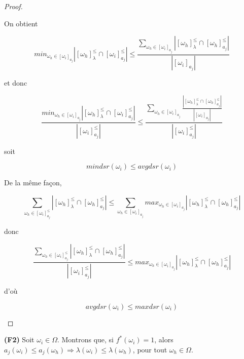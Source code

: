 \documentclass[a4paper]{article}
\begin{document}
\begin{proof}
\begin{itemize}
    On obtient
    
    $$min_{\omega_h \in [\omega_i]_{a_j}} |[\omega_h]^{\leq}_{\lambda} \cap
    [\omega_i]^{\leq}_{a_j}| \leq \frac{\sum_{\omega_h \in [\omega_i]_{a_j}}
    |[\omega_h]^{\leq}_{\lambda} \cap
    [\omega_h]^{\leq}_{a_j}|}{|[\omega_i]_{a_j}|} $$  

    et donc

    $$\frac{min_{\omega_h \in [\omega_i]_{a_j}} |[\omega_h]^{\leq}_{\lambda}
    \cap [\omega_i]^{\leq}_{a_j}|}{|[\omega_i]^{\leq}_{a_j}|} \leq
    \frac{\sum_{\omega_h \in [\omega_i]_{a_j}}
    \frac{|[\omega_h]^{\leq}_{\lambda} \cap
    [\omega_h]^{\leq}_{a_j}|}{|[\omega_i]_{a_j}|}}{|[\omega_i]^{\leq}_{a_j}|} $$  

    soit

    $$ mindsr(\omega_i) \leq avgdsr(\omega_i) $$

De la même façon,

$$ \sum_{\omega_h \in [\omega_i]^{\leq}_{a_j}}|[\omega_h]^{\leq}_{\lambda} \cap
[\omega_h]^{\leq}_{a_j}| \leq \sum_{\omega_h \in [\omega_i]_{a_j}} max_{\omega_h
\in [\omega_i]_{a_j}} |[\omega_h]^{\leq}_{\lambda} \cap
[\omega_h]^{\leq}_{a_j}|$$

donc

$$ \frac{\sum_{\omega_h \in [\omega_i]^{\leq}_{a_j}}|[\omega_h]^{\leq}_{\lambda}
\cap [\omega_h]^{\leq}_{a_j}|}{|[\omega_i]^{\leq}_{a_j}|} \leq max_{\omega_h \in
[\omega_i]_{a_j}} |[\omega_h]^{\leq}_{\lambda} \cap [\omega_h]^{\leq}_{a_j}|$$

d'où

$$ avgdsr(\omega_i) \leq maxdsr(\omega_i)$$

\end{itemize}
\end{proof}

\textbf{(F2)} Soit $\omega_i \in \Omega$. Montrons que, si $f^*(\omega_i) = 1$, 
alors $a_j(\omega_i) \leq a_j(\omega_h) \Rightarrow \lambda(\omega_i) \leq
\lambda(\omega_h)$, pour tout $\omega_h \in \Omega$.
\end{document}
